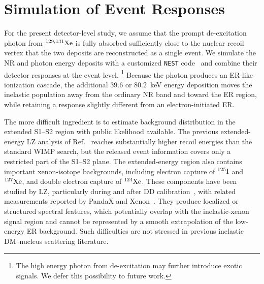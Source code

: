 \documentclass[11pt,a4paper]{article}
\begin{document}
\section{Simulation of Event Responses}
\label{sec:signal_background}
For the present detector-level study, we assume that the prompt de-excitation photon from $^{129,131}{\rm Xe}$ is fully absorbed sufficiently close to the nuclear recoil vertex that the two deposits are reconstructed as a single event. We simulate the NR and photon energy deposits with a customized \texttt{NEST} code~\cite{Szydagis:2011tk,Szydagis:2022ikv} and combine their detector responses at the event level. \footnote{The high energy photon from de-excitation may further introduce exotic signals. We defer this possibility to future work.} Because the photon produces an ER-like ionization cascade, the additional $39.6$ or $80.2$~keV energy deposition moves the inelastic population away from the ordinary NR band and toward the ER region, while retaining a response slightly different from an electron-initiated ER. %

The more difficult ingredient is to estimate background distribution in the extended S1--S2 region with public likelihood available. The previous extended-energy LZ analysis of Ref.~\cite{LZ:2023lvz} reaches substantially higher recoil energies than the standard WIMP search, but the released event information covers only a restricted part of the S1--S2 plane. The extended-energy region also contains important xenon-isotope backgrounds, including electron capture of $^{125}{\rm I}$ and $^{127}{\rm Xe}$, and double electron capture of $^{124}{\rm Xe}$. These components have been studied by LZ, particularly during and after DD calibration~\cite{LZ:2024wvs}, with related measurements reported by PandaX and Xenon~\cite{PandaX-4T:2024fls,XENON:2022evz}. They produce localized or structured spectral features, which potentially overlap with the inelastic-xenon signal region and cannot be represented by a smooth extrapolation of the low-energy ER background. Such difficulties are not stressed in previous inelastic DM--nucleus scattering literature. 
\end{document}

